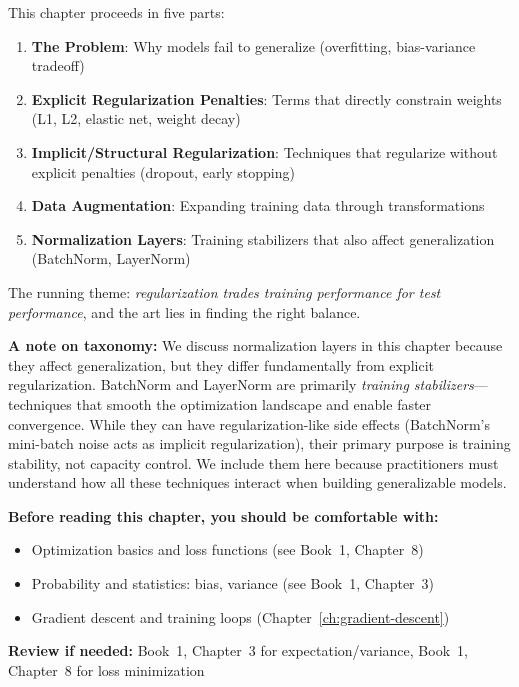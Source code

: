 \documentclass[../../main.tex]{subfiles}
\begin{document}
\begin{intuition}
This chapter proceeds in five parts:
\begin{enumerate}
    \item \textbf{The Problem}: Why models fail to generalize (overfitting, bias-variance tradeoff)
    \item \textbf{Explicit Regularization Penalties}: Terms that directly constrain weights (L1, L2, elastic net, weight decay)
    \item \textbf{Implicit/Structural Regularization}: Techniques that regularize without explicit penalties (dropout, early stopping)
    \item \textbf{Data Augmentation}: Expanding training data through transformations
    \item \textbf{Normalization Layers}: Training stabilizers that also affect generalization (BatchNorm, LayerNorm)
\end{enumerate}
The running theme: \textit{regularization trades training performance for test performance}, and the art lies in finding the right balance.

\textbf{A note on taxonomy:} We discuss normalization layers in this chapter because they affect generalization, but they differ fundamentally from explicit regularization. BatchNorm and LayerNorm are primarily \textit{training stabilizers}---techniques that smooth the optimization landscape and enable faster convergence. While they can have regularization-like side effects (BatchNorm's mini-batch noise acts as implicit regularization), their primary purpose is training stability, not capacity control. We include them here because practitioners must understand how all these techniques interact when building generalizable models.
\end{intuition}

\begin{prerequisites}
\textbf{Before reading this chapter, you should be comfortable with:}
\begin{itemize}
    \item Optimization basics and loss functions (see Book~1, Chapter~8)
    \item Probability and statistics: bias, variance (see Book~1, Chapter~3)
    \item Gradient descent and training loops (Chapter~\ref{ch:gradient-descent})
\end{itemize}
\textbf{Review if needed:} Book~1, Chapter~3 for expectation/variance, Book~1, Chapter~8 for loss minimization
\end{prerequisites}
\end{document}

